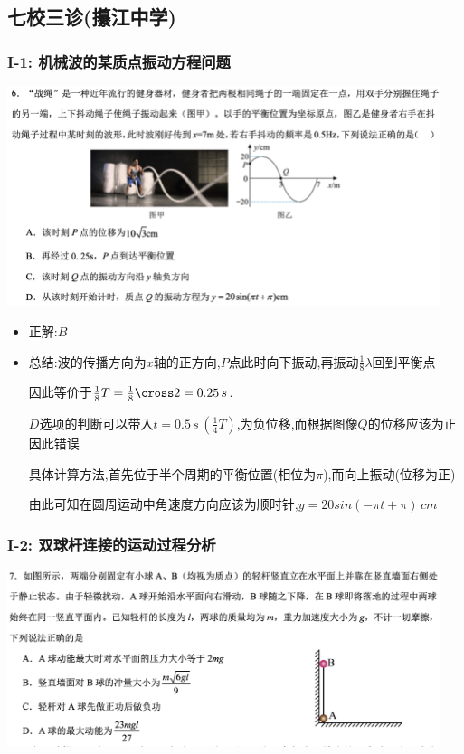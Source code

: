 \documentclass{article}
\begin{document}
\subsection{七校三诊(攥江中学)}

\subsubsection{I-1: 机械波的某质点振动方程问题}
\includegraphics[width=0.95\textwidth,keepaspectratio]{./pictures/3.11-1.png}

\begin{itemize}
    \item 正解:\quad $B$
    \item 总结:\quad 波的传播方向为$x$轴的正方向,$P$点此时向下振动,再振动$\frac{1}{8} \lambda$回到平衡点

          \hspace{3.2em}因此等价于$\frac{1}{8} T = \frac{1}{8} \cross 2 = 0.25 \,s $.

          \hspace{3.2em}$D$选项的判断可以带入$t = 0.5 \,s \, (\frac{1}{4}T)$,为负位移,而根据图像$Q$的位移应该为正因此错误

          \hspace{3.2em}具体计算方法,首先位于半个周期的平衡位置(相位为$\pi$),而向上振动(位移为正)

          \hspace{3.2em}由此可知在圆周运动中角速度方向应该为顺时针,$y = 20 sin(-\pi t + \pi) \, cm$
\end{itemize}

\vspace{2em}

\subsubsection{I-2: 双球杆连接的运动过程分析}
\includegraphics[width=0.95\textwidth,keepaspectratio]{./pictures/3.11-6.png}
\end{document}

